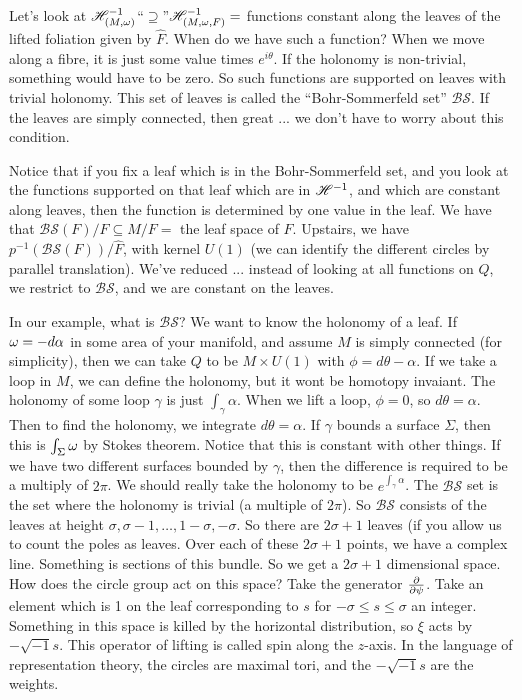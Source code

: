  \def\BS{\mathcal{BS}}

 Let's look at $\mathscr{H}^{-1}_{(M,\omega)}$``$\supseteq$''$\mathscr{H}^{-1}_{(M,\omega,F)} = $ functions
 constant along the leaves of the lifted foliation given by $\hat F$.  When do we have
 such a function?  When we move along a fibre, it is just some value times
 $e^{i\theta}$.  If the holonomy is non-trivial, something would have to be zero.  So
 such functions are supported on leaves with trivial holonomy.  This set of leaves is
 called the ``Bohr-Sommerfeld set'' $\BS$.  If the leaves are simply connected, then great
 ... we don't have to worry about this condition.

 Notice that if you fix a leaf which is in the Bohr-Sommerfeld set, and you look at
 the functions supported on that leaf which are in $\mathscr{H}^{-1}$, and which are constant
 along leaves, then the function is determined by one value in the leaf.  We have that
 $\BS(F)/F\subseteq M/F =$ the leaf space of $F$.  Upstairs, we have
 $p^{-1}(\BS(F))/\hat F$, with kernel $U(1)$ (we can identify the different circles by
 parallel translation).  We've reduced ... instead of looking at all functions on $Q$,
 we restrict to $\BS$, and we are constant on the leaves.

 In our example, what is $\BS$?  We want to know the holonomy of a leaf.  If
 $\omega=-d\alpha$ in some area of your manifold, and assume $M$ is simply connected (for
 simplicity), then we can take $Q$ to be $M\times U(1)$ with $\phi = d\theta -\alpha$.
 If we take a loop in $M$, we can define the holonomy, but it wont be homotopy
 invaiant.  The holonomy of some loop $\gamma$ is just $\int_\gamma \alpha$.  When we
 lift a loop, $\phi=0$, so $d\theta = \alpha$.  Then to find the holonomy, we
 integrate $d\theta=\alpha$.  If $\gamma$ bounds a surface $\Sigma$, then this is
 $\int_\Sigma \omega$ by Stokes theorem.  Notice that this is constant with other things.
 If we have two different surfaces bounded by $\gamma$, then the difference is
 required to be a multiply of $2\pi$.  We should really take the holonomy to be
 $e^{\int_\gamma \alpha}$.  The $\BS$ set is the set where the holonomy is trivial (a
 multiple of $2\pi$).  So $\BS$ consists of the leaves at height $\sigma, \sigma -1,
 \dots, 1- \sigma, -\sigma$.  So there are $2\sigma +1 $ leaves (if you allow us to
 count the poles as leaves.  Over each of these $2\sigma+1$ points, we have a complex
 line.  Something is sections of this bundle.  So we get a $2\sigma +1$ dimensional
 space.  How does the circle group act on this space?  Take the generator
 $\frac{\partial }{\partial \psi}$.  Take an element which is 1 on the leaf corresponding to $s$ for
 $-\sigma \le s \le \sigma$ an integer.  Something in this space is killed by the
 horizontal distribution, so $\xi$ acts by $-\sqrt{-1}s$.  This operator of lifting is
 called spin along the $z$-axis.  In the language of representation theory, the
 circles are maximal tori, and the $-\sqrt{-1}s$ are the weights.

